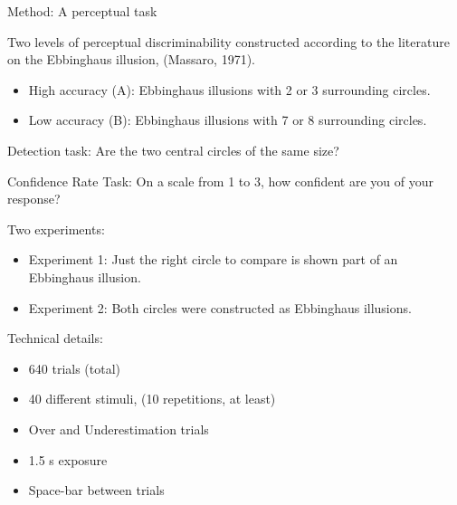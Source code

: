 \documentclass[final]{beamer}
\newlength{\onecolwid}
\begin{document}
\begin{frame}[t]
\begin{columns}[t]
\begin{column}{\onecolwid}
\begin{alertblock}{Method: A perceptual task}

Two levels of perceptual discriminability constructed according to the literature on the Ebbinghaus illusion, (Massaro, 1971).

\begin{itemize}
\item High accuracy (A): Ebbinghaus illusions with 2 or 3 surrounding circles.
\item Low accuracy (B): Ebbinghaus illusions with 7 or 8 surrounding circles.
\end{itemize}


Detection task:  Are the two central circles of the same size?


Confidence Rate Task:  On a scale from 1 to 3, how confident are you of your response?


Two experiments: 

\begin{itemize}
\item Experiment 1: Just the right circle to compare is shown part of an Ebbinghaus illusion.
\item Experiment 2: Both circles were constructed as Ebbinghaus illusions.
\end{itemize}

Technical details: 

\begin{itemize}
\item 640 trials (total)
\item 40 different stimuli, (10 repetitions, at least)
%
\item Over and Underestimation trials
\item 1.5 s exposure
\item Space-bar between trials
\end{itemize}
\end{alertblock}



\end{column}
\end{columns}
\end{frame}
\end{document}
